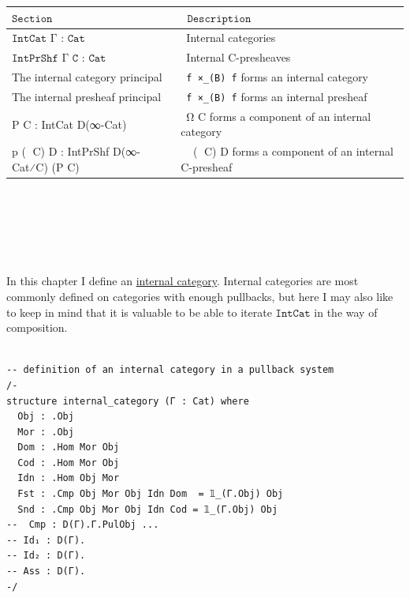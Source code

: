 \documentclass{book}
\theoremstyle{definition}
\newcounter{pcounter}
\newcounter{lcounter}
\newcounter{sectioncount}
\newcounter{subsectioncount}
\renewcommand{\section}[1]{\newpage\ \\ \ \\ \begin{center} \scalebox{1.5}{\texttt{\thesectioncount . #1}} \stepcounter{sectioncount} \setcounter{subsectioncount}{1} \end{center} \begin{center} \ \\ \ \\ \thispagestyle{empty} \end{center}}
\begin{document}
{
\footnotesize
\begin{center}
\begin{tabular}{||l || l ||} 
 \hline
 $\texttt{Section}$  &\ $\texttt{Description}$ \\
 \hline \hline
 $\texttt{IntCat Γ : Cat}$   &\ Internal categories \\ 
 \hline
 $\texttt{IntPrShf Γ C : Cat}$ &\ Internal C-presheaves \\ 
 \hline
 The internal category principal &\ \texttt{f ×\_(B) f} forms an internal category\\
 \hline
 The internal presheaf principal &\ \texttt{f ×\_(B) f} forms an internal presheaf\\
 \hline
 P⃗ C : IntCat D(∞-Cat) &\ Ω⃗ C forms a component of an internal category \\
 \hline
 p⃗ (𝟙 C) D : IntPrShf D(∞-Cat⁄C) (P⃗ C) &\ ω⃗ (𝟙 C) D forms a component of an internal C-presheaf \\
 \hline
\end{tabular}
\end{center}
}

\section{\texttt{IntCat Γ}}

In this chapter I define an \href{https://ncatlab.org/nlab/show/internal+category}{internal category}. Internal categories are most commonly defined on categories with enough pullbacks, but here I may also like to keep in mind that it is valuable to be able to iterate $\texttt{IntCat}$ in the way of composition.\\

\begin{center}
\begin{tcolorbox}[width=5in,colback={white},title={\begin{center}\texttt{Lean \thelcounter} \addtocounter{lcounter}{1}  \end{center}},colbacktitle=Blue,coltitle=black]
\begin{verbatim}

-- definition of an internal category in a pullback system
/-
structure internal_category (Γ : Cat) where
  Obj : .Obj
  Mor : .Obj
  Dom : .Hom Mor Obj
  Cod : .Hom Mor Obj
  Idn : .Hom Obj Mor
  Fst : .Cmp Obj Mor Obj Idn Dom  = 𝟙_(Γ.Obj) Obj
  Snd : .Cmp Obj Mor Obj Idn Cod = 𝟙_(Γ.Obj) Obj
--  Cmp : D(Γ).Γ.PulObj ...
-- Id₁ : D(Γ).
-- Id₂ : D(Γ).
-- Ass : D(Γ).
-/

\end{verbatim}
\end{tcolorbox}
\end{center}
\end{document}

